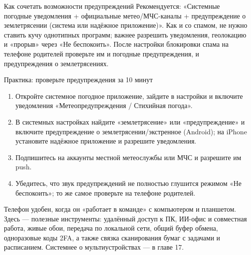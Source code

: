 \begin{tcbinfo}{Как сочетать возможности предупреждений}
Рекомендуется: «Системные погодные уведомления + официальные метео/МЧС-каналы + предупреждение о землетрясении (система или надёжное приложение)». Как и со спамом, не нужно ставить кучу однотипных программ; важнее разрешить уведомления, геолокацию и «прорыв» через «Не беспокоить». После настройки блокировки спама на телефоне родителей проверьте им и погодные предупреждения, и предупреждения о землетрясениях.

\end{tcbinfo}

\begin{tcbpractice}{Практика: проверьте предупреждения за 10 минут}
\begin{enumerate}
  \item Откройте системное погодное приложение, зайдите в настройки и включите уведомления «Метеопредупреждения / Стихийная погода».
  \item В системных настройках найдите «землетрясение» или «предупреждение» и включите предупреждение о землетрясении/экстренное (Android); на iPhone установите надёжное приложение и разрешите уведомления.
  \item Подпишитесь на аккаунты местной метеослужбы или МЧС и разрешите им push.
  \item Убедитесь, что звук предупреждений не полностью глушится режимом «Не беспокоить»; то же самое проверьте на телефоне родителей.
\end{enumerate}

\end{tcbpractice}


Телефон удобен, когда он «работает в команде» с компьютером и планшетом. Здесь — полезные инструменты: удалённый доступ к ПК, ИИ-офис и совместная работа, живые обои, передача по локальной сети, общий буфер обмена, одноразовые коды 2FA, а также связка сканирования бумаг с задачами и расписанием. Системнее о мультиустройствах — в главе 17.


